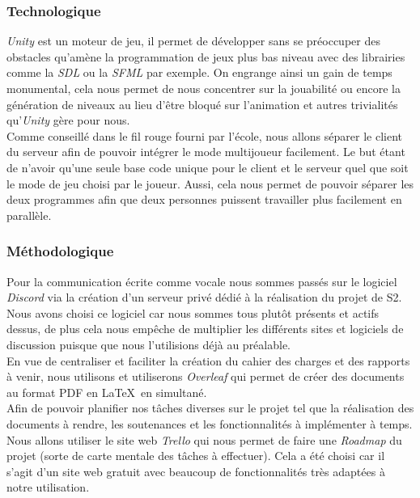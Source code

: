 \documentclass{article}
\begin{document}
\pagebreak

\subsubsection{Technologique}


\textit{Unity} est un moteur de jeu, il permet de développer sans se préoccuper des obstacles qu'amène la programmation de jeux plus bas niveau avec des librairies comme la \textit{SDL} ou la \textit{SFML} par exemple. On engrange ainsi un gain de temps monumental, cela nous permet de nous concentrer sur la jouabilité ou encore la génération de niveaux au lieu d'être bloqué sur l'animation et autres trivialités qu'\textit{Unity} gère pour nous. \\

Comme conseillé dans le fil rouge fourni par l'école, nous allons séparer le client du serveur afin de pouvoir intégrer le mode multijoueur facilement. Le but étant de n'avoir qu'une seule base code unique pour le client et le serveur quel que soit le mode de jeu choisi par le joueur. Aussi, cela nous permet de pouvoir séparer les deux programmes afin que deux personnes puissent travailler plus facilement en parallèle.

\subsubsection{Méthodologique}


Pour la communication écrite comme vocale nous sommes passés sur le logiciel \textit{Discord} via la création d'un serveur privé dédié à la réalisation du projet de S2. Nous avons choisi ce logiciel car nous sommes tous plutôt présents et actifs dessus, de plus cela nous empêche de multiplier les différents sites et logiciels de discussion puisque que nous l'utilisions déjà au préalable. \\

En vue de centraliser et faciliter la création du cahier des charges et des rapports à venir, nous utilisons et utiliserons \textit{Overleaf} qui permet de créer des documents au format PDF en \LaTeX \ en simultané. \\

Afin de pouvoir planifier nos tâches diverses sur le projet tel que la réalisation des documents à rendre, les soutenances et les fonctionnalités à implémenter à temps. Nous allons utiliser le site web \textit{Trello} qui nous permet de faire une \textit{Roadmap} du projet (sorte de carte mentale des tâches à effectuer). Cela a été choisi car il s'agit d'un site web gratuit avec beaucoup de fonctionnalités très adaptées à notre utilisation. \\
\end{document}
